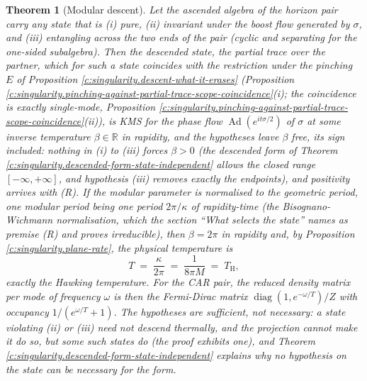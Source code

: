 \documentclass[11pt]{article}
\newtheorem{theorem}{Theorem}[section]
\theoremstyle{definition}
\theoremstyle{plain}
\newcommand{\changedmark}[2]{\marginpar{\raggedright\scriptsize\color{#1}#2}}
\providecommand{\R}{}\renewcommand{\R}{\mathbb{R}}
\providecommand{\TH}{}\renewcommand{\TH}{T_{\mathrm{H}}}
\begin{document}
\begin{theorem}[Modular descent]\label{c:singularity.modular-descent}
\changedmark{BurntOrange}{changed since the deposit}
Let the ascended algebra of the horizon pair carry any state that is (i) pure, (ii) invariant under the boost flow generated by $\sigma$, and (iii) entangling across the two ends of the pair (cyclic and separating for the one-sided subalgebra). Then the descended state, the partial trace over the partner, which for such a state coincides with the restriction under the pinching $E$ of Proposition \ref{c:singularity.descent-what-it-erases} (Proposition \ref{c:singularity.pinching-against-partial-trace-scope-coincidence}(i); the coincidence is exactly single-mode, Proposition \ref{c:singularity.pinching-against-partial-trace-scope-coincidence}(ii)), is KMS for the phase flow $\operatorname{Ad}(e^{it\sigma/2})$ of $\sigma$ at some inverse temperature $\beta \in \R$ in rapidity, and the hypotheses leave $\beta$ free, its sign included: nothing in (i) to (iii) forces $\beta > 0$ (the descended form of Theorem \ref{c:singularity.descended-form-state-independent} allows the closed range $[-\infty, +\infty]$, and hypothesis (iii) removes exactly the endpoints), and positivity arrives with (R). If the modular parameter is normalised to the geometric period, one modular period being one period $2\pi/\kappa$ of rapidity-time (the Bisognano-Wichmann normalisation, which the section ``What selects the state'' names as premise (R) and proves irreducible), then $\beta = 2\pi$ in rapidity and, by Proposition \ref{c:singularity.plane-rate}, the physical temperature is
\[
T \;=\; \frac{\kappa}{2\pi} \;=\; \frac{1}{8\pi M} \;=\; \TH ,
\]
exactly the Hawking temperature. For the CAR pair, the reduced density matrix per mode of frequency $\omega$ is then the Fermi-Dirac matrix $\operatorname{diag}(1, e^{-\omega/T})/Z$ with occupancy $1/(e^{\omega/T} + 1)$. The hypotheses are sufficient, not necessary: a state violating (ii) or (iii) need not descend thermally, and the projection cannot make it do so, but some such states do (the proof exhibits one), and Theorem \ref{c:singularity.descended-form-state-independent} explains why no hypothesis on the state can be necessary for the \emph{form}.
\end{theorem}
\end{document}
